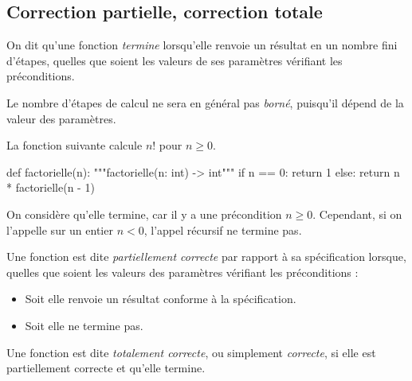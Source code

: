 \documentclass{magnolia}
\begin{document}
\subsection{Correction partielle, correction totale}

\begin{definition}[nom={Terminaison d'une fonction}]
  On dit qu'une fonction \emph{termine} lorsqu'elle renvoie un résultat
  en un nombre fini d'étapes, quelles que soient les valeurs de ses
  paramètres vérifiant les préconditions.
\end{definition}


\begin{remarqueUnique}
  \remarque Le nombre d'étapes de calcul ne sera en général pas \emph{borné},
  puisqu'il dépend de la valeur des paramètres.
\end{remarqueUnique}

\begin{exempleUnique}
\exemple
  La fonction suivante calcule $n!$ pour $n \geq 0$.
\begin{pythoncodeline}
def factorielle(n):
    """factorielle(n: int) -> int"""
    if n == 0:
        return 1
    else:
        return n * factorielle(n - 1)
\end{pythoncodeline}
  On considère qu'elle termine, car il y a une précondition $n \geq 0$.
  Cependant, si on l'appelle sur un entier $n < 0$, l'appel récursif ne termine pas.
\end{exempleUnique}

\begin{definition}[nom={Correction partielle}]
  Une fonction est dite \emph{partiellement correcte} par rapport à
  sa spécification lorsque, quelles que soient les valeurs des paramètres
  vérifiant les préconditions :
  \begin{itemize}
    \item Soit elle renvoie un résultat conforme à la spécification.
    \item Soit elle ne termine pas.
  \end{itemize}
\end{definition}

\begin{definition}[nom={Correction totale}]
  Une fonction est dite \emph{totalement correcte}, ou simplement \emph{correcte},
  si elle est partiellement correcte et qu'elle termine.
\end{definition}
\end{document}
